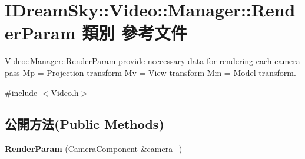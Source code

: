 \hypertarget{class_i_dream_sky_1_1_video_1_1_manager_1_1_render_param}{}\section{I\+Dream\+Sky\+:\+:Video\+:\+:Manager\+:\+:Render\+Param 類別 參考文件}
\label{class_i_dream_sky_1_1_video_1_1_manager_1_1_render_param}


\hyperlink{class_i_dream_sky_1_1_video_1_1_manager_1_1_render_param}{Video\+::\+Manager\+::\+Render\+Param} provide neccessary data for rendering each camera pass Mp = Projection transform Mv = View transform Mm = Model transform.  




{\ttfamily \#include $<$Video.\+h$>$}

\subsection*{公開方法(Public Methods)}
\begin{DoxyCompactItemize}
\item 
{\bfseries Render\+Param} (\hyperlink{class_i_dream_sky_1_1_camera_component}{Camera\+Component} \&camera\+\_\+)\hypertarget{class_i_dream_sky_1_1_video_1_1_manager_1_1_render_param_a1f521ca736e476b4c560f6d834e38a35}{}\label{class_i_dream_sky_1_1_video_1_1_manager_1_1_render_param_a1f521ca736e476b4c560f6d834e38a35}

\end{DoxyCompactItemize}
